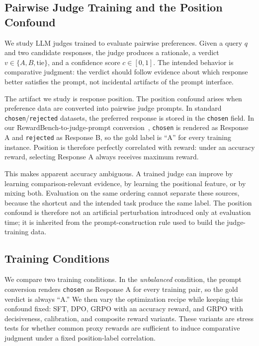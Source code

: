 \documentclass[letterpaper]{article}
\begin{document}
\subsection{Pairwise Judge Training and the Position Confound}

We study LLM judges trained to evaluate pairwise preferences. Given a query $q$ and two candidate responses, the judge produces a rationale, a verdict $v \in \{A, B, \text{tie}\}$, and a confidence score $c \in [0, 1]$. The intended behavior is comparative judgment: the verdict should follow evidence about which response better satisfies the prompt, not incidental artifacts of the prompt interface.

The artifact we study is response position. The position confound arises when preference data are converted into pairwise judge prompts. In standard \texttt{chosen}/\texttt{rejected} datasets, the preferred response is stored in the \texttt{chosen} field. In our RewardBench-to-judge-prompt conversion~\citep{lambert2024rewardbench}, \texttt{chosen} is rendered as Response A and \texttt{rejected} as Response B, so the gold label is ``A'' for every training instance. Position is therefore perfectly correlated with reward: under an accuracy reward, selecting Response A always receives maximum reward.

This makes apparent accuracy ambiguous. A trained judge can improve by learning comparison-relevant evidence, by learning the positional feature, or by mixing both. Evaluation on the same ordering cannot separate these sources, because the shortcut and the intended task produce the same label. The position confound is therefore not an artificial perturbation introduced only at evaluation time; it is inherited from the prompt-construction rule used to build the judge-training data.

\subsection{Training Conditions}

We compare two training conditions. In the \emph{unbalanced} condition, the prompt conversion renders \texttt{chosen} as Response A for every training pair, so the gold verdict is always ``A.'' We then vary the optimization recipe while keeping this confound fixed: SFT, DPO, GRPO with an accuracy reward, and GRPO with decisiveness, calibration, and composite reward variants. These variants are stress tests for whether common proxy rewards are sufficient to induce comparative judgment under a fixed position-label correlation.
\end{document}

